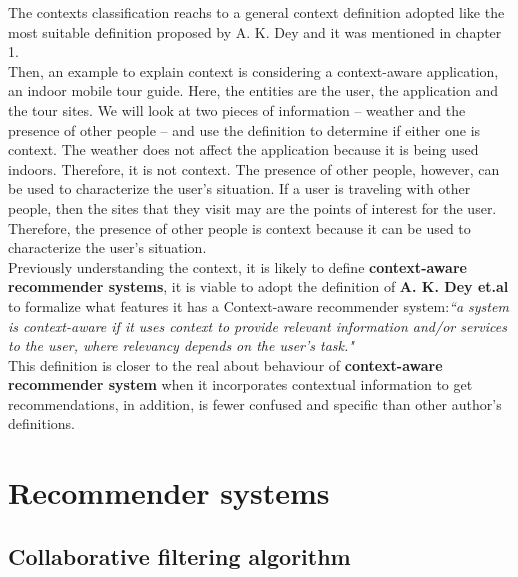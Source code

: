 The contexts classification reachs to a general context definition
adopted like the most suitable definition proposed by A. K. Dey  and it
was mentioned in chapter 1.\\ 
Then, an example to explain context is considering a context-aware
application, an indoor mobile tour guide. Here, the
entities are the user, the application and the tour sites.  We will
look at two pieces of information – weather and the presence of other
people – and use the definition to determine if either one is context.
The weather does not affect the application because it is being used
indoors. Therefore, it is not context. The presence of other people,
however, can be used to characterize the user’s situation. If a user
is traveling with other people, then the sites that they visit may are
the points of interest for the user. Therefore, the presence of other
people is context because it can be used to characterize the user’s
situation. \\ 
Previously understanding the context, it is likely to define \textbf
{context-aware recommender systems}, it is viable to adopt the
definition of \textbf{A. K. Dey et.al}\cite{dey2001understanding} to
formalize what features it has a Context-aware recommender
system:\textit{``a system is context-aware if it uses context to
provide relevant information and/or services  to the user, where
relevancy depends on the user’s task."} \\  This definition is closer
to the real about behaviour of \textbf{context-aware recommender
system} when it incorporates contextual information to get
recommendations,  in addition, is fewer confused and specific than
other author's definitions.

\section{Recommender systems}

\subsection{Collaborative filtering algorithm}

